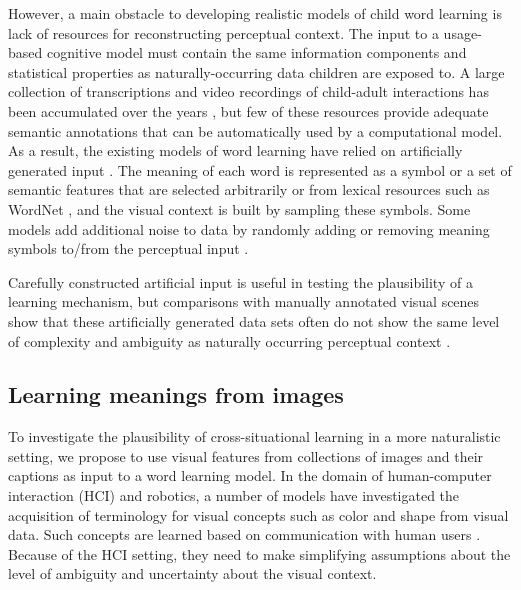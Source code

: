 However, a main obstacle to developing realistic models of child word
learning is lack of resources for reconstructing perceptual
context. The input to a usage-based cognitive model must contain the
same information components and statistical properties as
naturally-occurring data children are exposed to. A large collection
of transcriptions and video recordings of child-adult interactions has
been accumulated over the years \cite{macwhinney2014childes}, but few
of these resources provide adequate semantic annotations that can be
automatically used by a computational model. As a result, the existing
models of word learning have relied on artificially generated
input \cite{siskind.96}. The meaning of each word is represented as a symbol or a set of
semantic features that are selected arbitrarily or from lexical
resources such as WordNet \cite{fellbaum1998wordnet}, and the visual
context is built by sampling these symbols. Some models add additional noise
to data by randomly adding or removing meaning symbols to/from the perceptual
input \cite{fazly.etal.10csj}.

Carefully constructed artificial input is useful in testing the
plausibility of a learning mechanism, but comparisons with manually
annotated visual scenes show that these artificially generated data
sets often do not show the same level of complexity and ambiguity as
naturally occurring perceptual context
\cite{matusevych2013automatic,beekhuizen2013word}.

\subsection{Learning meanings from images}
\label{subsec:meanings-from-images}
To investigate the plausibility of cross-situational learning in a
more naturalistic setting, we propose to use visual features from
collections of images and their captions as input to a word learning
model.
%
In the domain of human-computer interaction (HCI) and robotics, a
number of models have investigated the acquisition of terminology for
visual concepts such as color and shape from visual data. Such
concepts are learned based on communication with human users
\cite{FleischmanRoy2005,skocaj2011system}.  Because of the HCI
setting, they need to make simplifying assumptions about the level of
ambiguity and uncertainty about the visual context.

